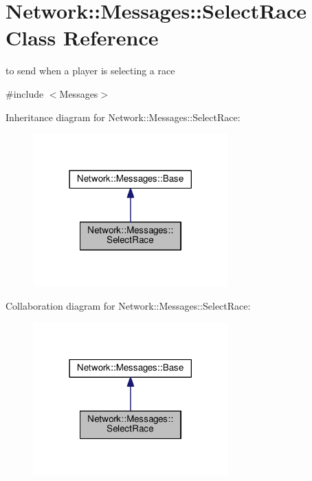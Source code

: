\hypertarget{class_network_1_1_messages_1_1_select_race}{}\section{Network\+:\+:Messages\+:\+:Select\+Race Class Reference}
\label{class_network_1_1_messages_1_1_select_race}


to send when a player is selecting a race  




{\ttfamily \#include $<$Messages$>$}



Inheritance diagram for Network\+:\+:Messages\+:\+:Select\+Race\+:
\nopagebreak
\begin{figure}[H]
\begin{center}
\leavevmode
\includegraphics[width=213pt]{class_network_1_1_messages_1_1_select_race__inherit__graph}
\end{center}
\end{figure}


Collaboration diagram for Network\+:\+:Messages\+:\+:Select\+Race\+:
\nopagebreak
\begin{figure}[H]
\begin{center}
\leavevmode
\includegraphics[width=213pt]{class_network_1_1_messages_1_1_select_race__coll__graph}
\end{center}
\end{figure}
